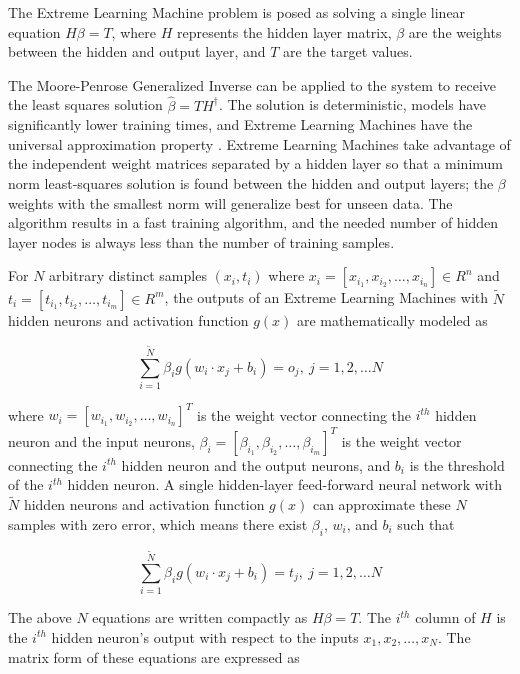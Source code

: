 The Extreme Learning Machine problem is posed as solving a single linear equation $H \beta = T$, where $H$ represents the hidden layer matrix, $\beta$ are the weights between the hidden and output layer, and $T$ are the target values.

The Moore-Penrose Generalized Inverse can be applied to the system to receive the least squares solution $\hat{\beta} = T {H}^\dagger$.
The solution is deterministic, models have significantly lower training times, and Extreme Learning Machines have the universal approximation property \citet{Huang2:2006}.
Extreme Learning Machines take advantage of the independent weight matrices separated by a hidden layer so that a minimum norm least-squares solution is found between the hidden and output layers; the $\beta $ weights with the smallest norm will generalize best for unseen data.
The algorithm results in a fast training algorithm, and the needed number of hidden layer nodes is always less than the number of training samples.

For $N$ arbitrary distinct samples $(x_i, t_i) $ where $x_i = \left[ x_{i_{1}}, x_{i_{2}}, \dots, x_{i_{n}} \right] \in R^n$ and $t_i = \left[ t_{i_{1}}, t_{i_{2}}, \dots, t_{i_{m}} \right] \in R^m$, the outputs of an Extreme Learning Machines with $\tilde{N}$ hidden neurons and activation function $g(x)$ are mathematically modeled as

\begin{equation}
	\sum_{i=1}^{\tilde{N}} \beta_i g (w_i \cdot x_j + b_i)=o_j,\ j=1,2, \dots N\label{eq:equation3}
\end{equation}

where $w_i = \left[ w_{i_{1}}, w_{i_{2}}, \dots, w_{i_{n}} \right]^T$ is the weight vector connecting the $i^{th}$ hidden neuron and the input neurons, $\beta_i=\left[ \beta_{i_{1}}, \beta_{i_{2}}, \dots, \beta_{i_{m}}\right]^T$ is the weight vector connecting the $i^{th}$ hidden neuron and the output neurons, and $b_i$ is the threshold of the $i^{th}$ hidden neuron.
A single hidden-layer feed-forward neural network with $\tilde{N}$ hidden neurons and activation function $g(x)$ can approximate these $N$ samples with zero error, which means there exist $\beta_i$, $w_i$, and $b_i$ such that

\begin{equation}
	\sum_{ i = 1}^{\tilde{N}} \beta_i g (w_i \cdot x_j + b_i) = t_j,\ j=1,2, \dots N\label{eq:equation4}
\end{equation}

The above $N$ equations are written compactly as $H \beta = T$.
The $i^{th}$ column of $H$ is the $i^{th}$ hidden neuron’s output with respect to the inputs $x_1, x_2, \dots, x_N$.
The matrix form of these equations are expressed as

